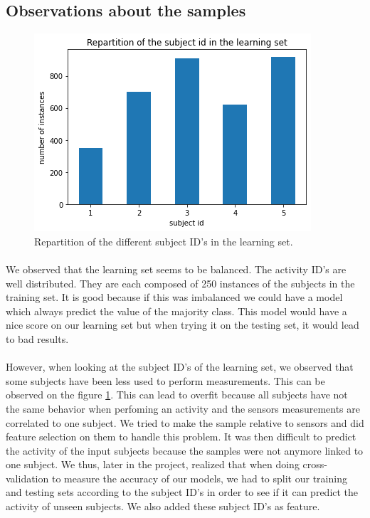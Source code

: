 \documentclass[a4paper, 11pt, oneside]{article}
\begin{document}
\subsection{Observations about the samples} \label{sec:obs}

\begin{figure}[H]
\center
\includegraphics[scale = 0.5]{preprocessing/subjects_repartition.png}
\caption{Repartition of the different subject ID's in the learning set.}
\label{subject_repartition}
\end{figure}

\paragraph{}We observed that the learning set seems to be balanced. The activity ID's are well distributed. They are each composed of 250 instances of the subjects in the training set. It is good because if this was imbalanced we could have a model which always predict the value of the majority class. This model would have a nice score on our learning set but when trying it on the testing set, it would lead to bad results. 

\paragraph{}However, when looking at the subject ID's of the learning set, we observed that some subjects have been less used to perform measurements. This can be observed on the figure \ref{subject_repartition}.
This can lead to overfit because all subjects have not the same behavior when perfoming an activity and the sensors measurements are correlated to one subject. We tried to make the sample relative to sensors and did feature selection on them to handle this problem. It was then difficult to predict the activity of the input subjects because the samples were not anymore linked to one subject. We thus, later in the project, realized that when doing cross-validation to measure the accuracy of our models, we had to split our training and testing sets according to the subject ID's in order to see if it can predict the activity of unseen subjects.
We also added these subject ID's as feature.
\end{document}

